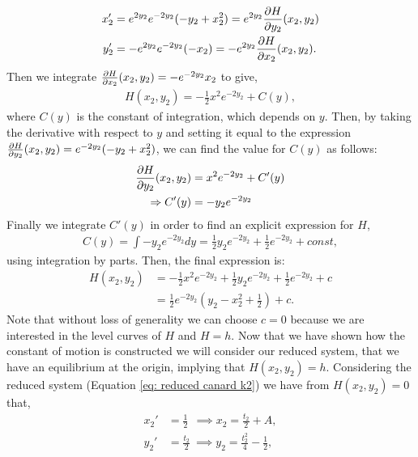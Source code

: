 \begin{align}
x_2' &=e^{2y_2}e^{-2y_2}( -y_2 +x_2^2 ) =e^{2y_2}\pd{H}{y_2}(x_2,y_2) \\
y_2' &= - e^{2y_2}e^{-2y_2}(-  x_2)=-e^{2y_2}\pd{H}{x_2}(x_2,y_2).
\end{align}
Then we integrate $ \pd{H}{x_2}(x_2,y_2) = -e^{-2y_2} x_2  $ to give,
\begin{align*}
 H(x_2,y_2) = - \frac{1}{2} x^2 e^{-2y_2} + C(y),
\end{align*}
where $C(y)$ is the constant of integration, which depends on $y$.
Then, by taking the derivative with respect to $y$ and setting it equal to the expression $\pd{H}{y_2}(x_2,y_2)=e^{-2y_2}( -y_2 +x_2^2 )$, we can find the value for $C(y)$ as follows: 
\begin{align*}
\pd{H}{y_2}(x_2,y_2)&= x^2 e^{-2y_2} + C'(y)\\
\Rightarrow C'(y) &= - y_2 e^{-2y_2}
\end{align*}
Finally we integrate $C'(y)$ in order to find an explicit expression for $H$,
\begin{align*}
C(y) = \int - y_2 e^{-2y_2} dy = \frac{1}{2} y_2 e^{-2y_2} + \frac{1}{2} e^{-2y_2} + const,
\end{align*}
using integration by parts.
Then, the final expression is:
\begin{align}
H(x_2,y_2)&=- \frac{1}{2} x^2 e^{-2y_2} + \frac{1}{2} y_2 e^{-2y_2} + \frac{1}{2} e^{-2y_2} + c\\
&= \frac{1}{2}e^{-2y_2}\left(y_2-x^2_2+\frac{1}{2}\right) +c. \label{eq: const of motion}
\end{align}
Note that without loss of generality we can choose $c=0$ because we are interested in the level curves of $H$ and $H=h$. Now that we have shown how the constant of motion is constructed we will consider our reduced system, that we have an equilibrium at the origin, implying that $H(x_2,y_2)=h$. Considering the reduced system (Equation \ref{eq: reduced canard k2}) we have from $ H(x_2,y_2)=0 $ that,
\begin{subequations}
	\begin{align}
	x_2'&=\frac{1}{2}\ \	\implies x_2=\frac{t_2}{2}+A, \label{canard: trajectory x}\\
	y_2'&=\frac{t_2}{2}\ \implies y_2=\frac{t_2^2}{4}-\frac{1}{2}, \label{canard: trajectory y}
	\end{align}
\end{subequations} 
